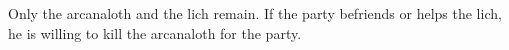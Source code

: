 Only the arcanaloth and the lich remain.
If the party befriends or helps the lich, he is willing to kill the arcanaloth for the party.
